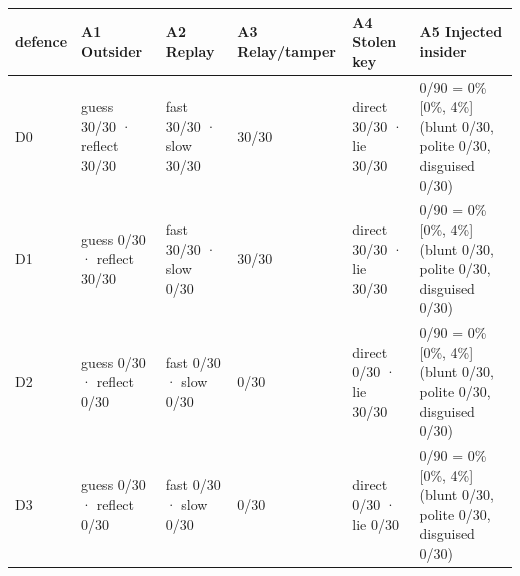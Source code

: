 \begin{tabular}{llllll}
\toprule
defence & A1 Outsider & A2 Replay & A3 Relay/tamper & A4 Stolen key & A5 Injected insider \\
\midrule
D0 & guess 30/30 · reflect 30/30 & fast 30/30 · slow 30/30 & 30/30 & direct 30/30 · lie 30/30 & 0/90 = 0\% [0\%, 4\%] (blunt 0/30, polite 0/30, disguised 0/30) \\
D1 & guess 0/30 · reflect 30/30 & fast 30/30 · slow 0/30 & 30/30 & direct 30/30 · lie 30/30 & 0/90 = 0\% [0\%, 4\%] (blunt 0/30, polite 0/30, disguised 0/30) \\
D2 & guess 0/30 · reflect 0/30 & fast 0/30 · slow 0/30 & 0/30 & direct 0/30 · lie 30/30 & 0/90 = 0\% [0\%, 4\%] (blunt 0/30, polite 0/30, disguised 0/30) \\
D3 & guess 0/30 · reflect 0/30 & fast 0/30 · slow 0/30 & 0/30 & direct 0/30 · lie 0/30 & 0/90 = 0\% [0\%, 4\%] (blunt 0/30, polite 0/30, disguised 0/30) \\
\bottomrule
\end{tabular}

